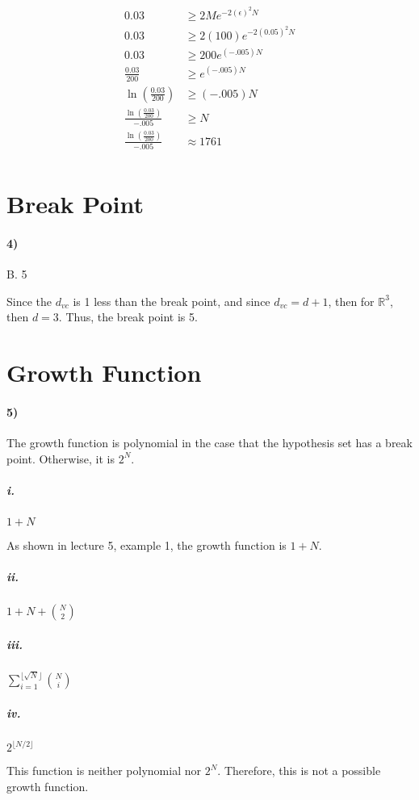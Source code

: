\documentclass[10pt,letter]{article}
\begin{document}
	\begin{align*}
	0.03 &\geq 2 M e ^{-2(\epsilon)^2N} \\
	0.03 &\geq 2 (100) e ^{-2(0.05)^2N} \\
	0.03 &\geq 200 e ^{(-.005)N} \\
	\frac{0.03}{200} &\geq e ^{(-.005)N} \\
	\ln (\frac{0.03}{200}) &\geq (-.005)N \\
	\frac{\ln (\frac{0.03}{200})}{-.005} &\geq N \\
	\frac{\ln (\frac{0.03}{200})}{-.005} &\approx 1761 \\
	\end{align*}

\section*{Break Point}

\paragraph{4)} B. 5
	
	Since the $d_{vc}$ is 1 less than the break point, and since $d_{vc} = d + 1$, then for $\mathbb R^3$, then $d = 3$. Thus, the break point is 5.
	
\section*{Growth Function}

\paragraph{5)} 

	The growth function is polynomial in the case that the hypothesis set has a break point. Otherwise, it is $2^N$.

	\subparagraph{i.} $1 + N$

		As shown in lecture 5, example 1, the growth function is $1 + N$.

	\subparagraph{ii.} $1 + N + \binom{N}{2}$

	\subparagraph{iii.} $\sum_{i=1}^{\lfloor{\sqrt N} \rfloor} \binom{N}{i}$

	\subparagraph{iv.} $2^{\lfloor{N/2}\rfloor}$

		This function is neither polynomial nor $2^N$. Therefore, this is not a possible growth function.
\end{document}
